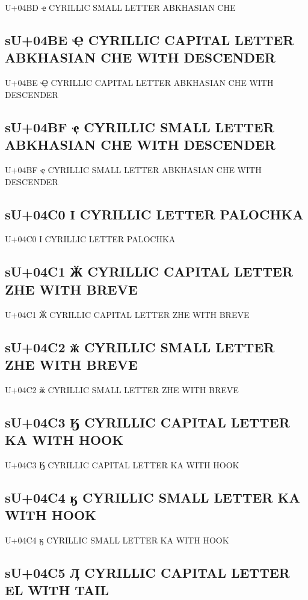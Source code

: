 U+04BD ҽ  CYRILLIC SMALL LETTER ABKHASIAN CHE

\subsection{sU+04BE Ҿ  CYRILLIC CAPITAL LETTER ABKHASIAN CHE WITH DESCENDER}

U+04BE Ҿ  CYRILLIC CAPITAL LETTER ABKHASIAN CHE WITH DESCENDER

\subsection{sU+04BF ҿ  CYRILLIC SMALL LETTER ABKHASIAN CHE WITH DESCENDER}

U+04BF ҿ  CYRILLIC SMALL LETTER ABKHASIAN CHE WITH DESCENDER

\subsection{sU+04C0 Ӏ  CYRILLIC LETTER PALOCHKA}

U+04C0 Ӏ  CYRILLIC LETTER PALOCHKA

\subsection{sU+04C1 Ӂ  CYRILLIC CAPITAL LETTER ZHE WITH BREVE}

U+04C1 Ӂ  CYRILLIC CAPITAL LETTER ZHE WITH BREVE

\subsection{sU+04C2 ӂ  CYRILLIC SMALL LETTER ZHE WITH BREVE}

U+04C2 ӂ  CYRILLIC SMALL LETTER ZHE WITH BREVE

\subsection{sU+04C3 Ӄ  CYRILLIC CAPITAL LETTER KA WITH HOOK}

U+04C3 Ӄ  CYRILLIC CAPITAL LETTER KA WITH HOOK

\subsection{sU+04C4 ӄ  CYRILLIC SMALL LETTER KA WITH HOOK}

U+04C4 ӄ  CYRILLIC SMALL LETTER KA WITH HOOK

\subsection{sU+04C5 Ӆ  CYRILLIC CAPITAL LETTER EL WITH TAIL}

